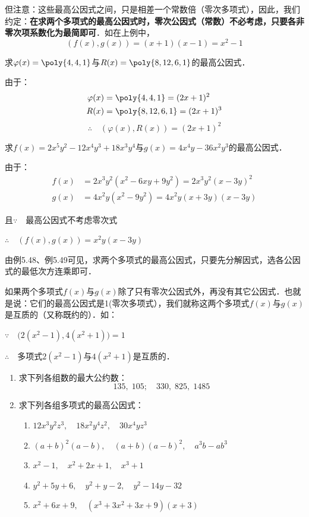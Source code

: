 但注意：这些最高公因式之间，只是相差一个常数倍（零次多项式），因此，我们约定：\textbf{在求两个多项式的最高公因式时，零次公因式（常数）不必考虑，只要各非零次项系数化为最简即可}．如在上例中，
\[(f(x),g(x))=(x+1)(x-1)=x^2-1\]
\begin{example}
求$\varphi(x)=\poly{4,4,1}$与$R(x)=\poly{8,12,6,1}$的最高公因式．
\end{example}

\begin{solution}
由于：\[\begin{split}
    \varphi(x)&=\poly{4,4,1}=(2x+1)^2\\
    R(x)&=\poly{8,12,6,1}=(2x+1)^3
\end{split}\]
\[\therefore\quad (\varphi(x), R(x))=(2x+1)^2\]
\end{solution}


\begin{example}
求$f(x)=2x^5y^2-12x^4y^3+18x^3y^4$与$g(x)=4x^4y-36x^2y^3$的最高公因式．
\end{example}

\begin{solution}
由于：\[\begin{split}
    f(x)&=2x^3y^2 (x^2-6xy+9y^2)=2x^3y^2(x-3y)^2\\
    g(x)&=4x^2y(x^2-9y^2)=4x^2y(x+3y)(x-3y)
\end{split}\]
\end{solution}
且$\because\quad $最高公因式不考虑零次式

$\therefore\quad (f(x),g(x))=x^2y(x-3y)$

由例5.48、例5.49可见，求两个多项式的最高公因式，只要先分解因式，选各公因式的最低次方连乘即可．

如果两个多项式$f(x)$与$g(x)$除了只有零次公因式外，再没有其它公因式．也就是说：它们的最高公因式是1(零次多项式），我们就称这两个多项式$f(x)$与$g(x)$是互质的（又称既约的）．如：

$\because\quad \big(2 (x^2-1) , 4 (x^2+1) \big) =1$

$\therefore\quad $多项式$2(x^2-1)$与$4(x^2+1)$是互质的．

\begin{ex}
\begin{enumerate}
    \item 求下列各组数的最大公约数：
    \[135,\; 105;\quad 330,\; 825,\; 1485\]
    \item 求下列各组多项式的最高公因式：
\begin{enumerate}
    \item $12x^3y^2z^3,\quad 18x^2y^4z^2,\quad 30x^4yz^3$
    \item $(a+b)^2(a-b),\quad (a+b)(a-b)^2,\quad a^3b-ab^3$
    \item $x^2-1,\quad x^2+2x+1,\quad x^3+1$
    \item $y^2+5y+6,\quad y^2+y-2,\quad y^2-14y-32$
    \item $x^2+6x+9,\quad (x^3+3x^2+3x+9)(x+3)$
\end{enumerate}
\end{enumerate}    
\end{ex}

